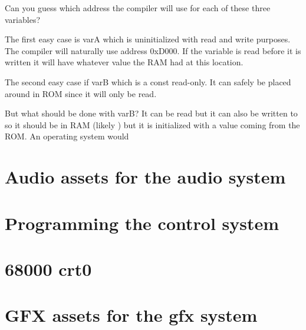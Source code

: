 

Can you guess which address the compiler will use for each of these three variables?

The first easy case is varA which is uninitialized with read and write purposes. The compiler will naturally use address 0xD000. If the variable is read before it is written it will have whatever value the RAM had at this location. 

The second easy case if varB which is a const read-only. It can safely be placed around  in ROM since it will only be read.

But what should be done with varB? It can be read but it can also be written to so it should be in RAM (likely ) but it is initialized with a value coming from the ROM. An operating system would 

\section{Audio assets for the audio system}

\section{Programming the control system}


\section{68000 crt0}
\pagebreak
{}

\section{GFX assets for the gfx system}

\pagebreak
{}
